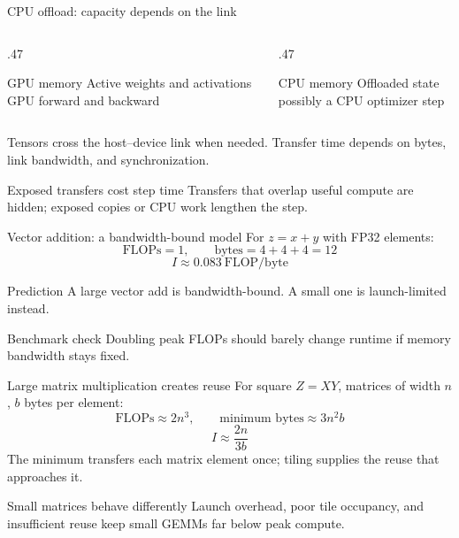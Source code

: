 \documentclass[handout]{beamer}
\begin{document}
\begin{frame}{CPU offload: capacity depends on the link}
  \begin{columns}[t]
    \begin{column}{.47\linewidth}
      \begin{block}{GPU memory}
        Active weights and activations\\GPU forward and backward
      \end{block}
    \end{column}
    \begin{column}{.47\linewidth}
      \begin{block}{CPU memory}
        Offloaded state\\possibly a CPU optimizer step
      \end{block}
    \end{column}
  \end{columns}
  \vspace{5pt}
  Tensors cross the host--device link when needed. Transfer time depends on bytes, link bandwidth, and synchronization.
  \begin{alertblock}{Exposed transfers cost step time}
    Transfers that overlap useful compute are hidden; exposed copies or CPU work lengthen the step.
  \end{alertblock}
\end{frame}



\begin{frame}{Vector addition: a bandwidth-bound model}
  For $z=x+y$ with FP32 elements:
  \[
    \text{FLOPs}=1,\qquad \text{bytes}=4+4+4=12
  \]
  \[
    I\approx 0.083\ \text{FLOP/byte}
  \]
  \begin{block}{Prediction}
    A large vector add is bandwidth-bound. A small one is launch-limited instead.
  \end{block}
  \begin{alertblock}{Benchmark check}
    Doubling peak FLOPs should barely change runtime if memory bandwidth stays fixed.
  \end{alertblock}
\end{frame}

\begin{frame}{Large matrix multiplication creates reuse}
  For square $Z=XY$, matrices of width $n$, $b$ bytes per element:
  \[
    \text{FLOPs}\approx2n^3,\qquad \text{minimum bytes}\approx3n^2b
  \]
  \[
    I\approx\frac{2n}{3b}
  \]
  The minimum transfers each matrix element once; tiling supplies the reuse that approaches it.
  \begin{alertblock}{Small matrices behave differently}
    Launch overhead, poor tile occupancy, and insufficient reuse keep small GEMMs far below peak compute.
  \end{alertblock}
\end{frame}
\end{document}
